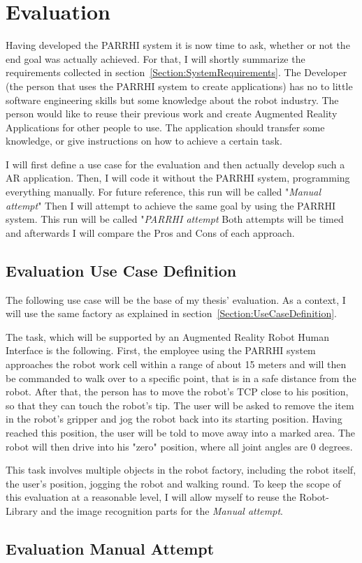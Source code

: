 \chapter{Evaluation}\label{Chap:Evaluation}

Having developed the PARRHI system it is now time to ask, whether or not the end goal was actually achieved. For that, I will shortly summarize the requirements collected in section~\ref{Section:SystemRequirements}. The Developer (the person that uses the PARRHI system to create applications) has no to little software engineering skills but some knowledge about the robot industry. The person would like to reuse their previous work and create Augmented Reality Applications for other people to use. The application should transfer some knowledge, or give instructions on how to achieve a certain task.

I will first define a use case for the evaluation and then actually develop such a AR application. Then, I will code it without the PARRHI system, programming everything manually. For future reference, this run will be called "\textit{Manual attempt}" Then I will attempt to achieve the same goal by using the PARRHI system. This run will be called "\textit{PARRHI attempt} Both attempts will be timed and afterwards I will compare the Pros and Cons of each approach.

\section{Evaluation Use Case Definition}
The following use case will be the base of my thesis' evaluation. As a context, I will use the same factory as explained in section~\ref{Section:UseCaseDefinition}. 

The task, which will be supported by an Augmented Reality Robot Human Interface is the following. First, the employee using the PARRHI system approaches the robot work cell within a range of about 15 meters and will then be commanded to walk over to a specific point, that is in a safe distance from the robot. After that, the person has to move the robot's TCP close to his position, so that they can touch the robot's tip. The user will be asked to remove the item in the robot's gripper and jog the robot back into its starting position. Having reached this position, the user will be told to move away into a marked area. The robot will then drive into his "zero" position, where all joint angles are 0 degrees. 

This task involves multiple objects in the robot factory, including the robot itself, the user's position, jogging the robot and walking round. To keep the scope of this evaluation at a reasonable level, I will allow myself to reuse the Robot-Library and the image recognition parts for the \textit{Manual attempt}.

\section{Evaluation Manual Attempt}



